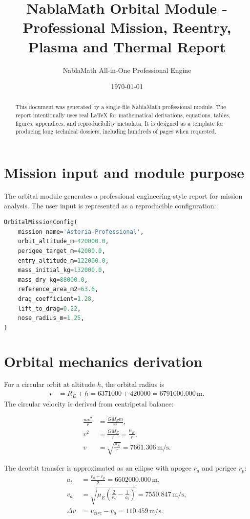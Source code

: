 \documentclass[11pt,a4paper]{article}
\title{NablaMath Orbital Module - Professional Mission, Reentry, Plasma and Thermal Report}
\author{NablaMath All-in-One Professional Engine}
\date{\today}
\begin{document}
\maketitle
\begin{abstract}
This document was generated by a single-file NablaMath professional module. The report intentionally uses real LaTeX for mathematical derivations, equations, tables, figures, appendices, and reproducibility metadata. It is designed as a template for producing long technical dossiers, including hundreds of pages when requested.
\end{abstract}
\tableofcontents
\newpage
\section{Mission input and module purpose}
        The orbital module generates a professional engineering-style report for mission analysis. The user input is represented as a reproducible configuration:
        \begin{lstlisting}[style=nabla,language=Python]
OrbitalMissionConfig(
    mission_name='Asteria-Professional',
    orbit_altitude_m=420000.0,
    perigee_target_m=42000.0,
    entry_altitude_m=122000.0,
    mass_initial_kg=132000.0,
    mass_dry_kg=88000.0,
    reference_area_m2=63.6,
    drag_coefficient=1.28,
    lift_to_drag=0.22,
    nose_radius_m=1.25,
)
        \end{lstlisting}

\section{Orbital mechanics derivation}
For a circular orbit at altitude $h$, the orbital radius is
\begin{align}
r &= R_E+h = 6371000+420000=6791000.000\,\mathrm{m}.
\end{align}
The circular velocity is derived from centripetal balance:
\begin{derivationbox}
\begin{align}
\frac{mv^2}{r} &= \frac{GM_E m}{r^2},\\
v^2&=\frac{GM_E}{r}=\frac{\mu_E}{r},\\
v&=\sqrt{\frac{\mu_E}{r}}=7661.306\,\mathrm{m/s}.
\end{align}
\end{derivationbox}
The deorbit transfer is approximated as an ellipse with apogee $r_a$ and perigee $r_p$:
\begin{align}
a_t &= \frac{r_a+r_p}{2}=6602000.000\,\mathrm{m},\\
v_a &= \sqrt{\mu_E\left(\frac{2}{r_a}-\frac{1}{a_t}\right)}=7550.847\,\mathrm{m/s},\\
\Delta v &= v_{circ}-v_a=110.459\,\mathrm{m/s}.
\end{align}
\end{document}
